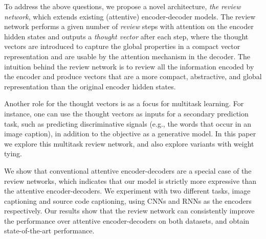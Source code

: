 \documentclass{article}
\begin{document}
To address the above questions, we propose a novel architecture, \textit{the review network}, which extends existing (attentive) encoder-decoder models. The review network performs a given number of \textit{review} steps with attention on the encoder hidden states and outputs a \textit{thought vector} after each step, where the thought vectors are introduced to capture the global properties in a compact vector representation and are usable by the attention mechanism in the decoder.
The intuition behind the review network is to review all the information encoded by the encoder and produce vectors that are a more compact, abstractive, and global representation than the original encoder hidden states.

Another role for the thought vectors is as a focus for multitask learning. For instance, one can use the thought vectors as inputs for a secondary prediction task, such as predicting discriminative signals (e.g., the words that occur in an image caption), in addition to the objective as a generative model. In this paper we explore this multitask review network, and also explore variants with weight tying.


We show that conventional attentive encoder-decoders are a special case of the review networks, which indicates that our model is strictly more expressive than the attentive encoder-decoders. We experiment with two different tasks, image captioning and source code captioning, using CNNs and RNNs as the encoders respectively. Our results show that the review network can consistently improve the performance over attentive encoder-decoders on both datasets, and obtain state-of-the-art performance.
\end{document}

